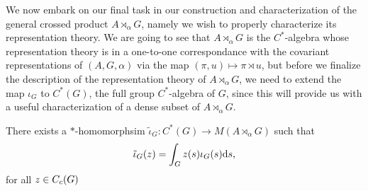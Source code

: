 We now embark on our final task in our construction and characterization of the general crossed product $A \rtimes_ \alpha G$, namely we wish to properly characterize its representation theory. We are going to see that $A \rtimes_\alpha G$ is the $C^*$-algebra whose representation theory is in a one-to-one correspondance with the covariant representations of $(A,G,\alpha)$ via the map $(\pi,u) \mapsto \pi \rtimes u$, but before we finalize the description of the representation theory of $A \rtimes_\alpha G$, we need to extend the map $\iota_G$ to $C^*(G)$, the full group $C^*$-algebra of $G$, since this will provide us with a useful characterization of a dense subset of $A \rtimes_\alpha G$.
\begin{lemma}
There exists a $*$-homomorphsim $\tilde \iota_G \colon C^*(G) \to M(A \rtimes_\alpha G)$ such that
\begin{align*}
	\tilde \iota_G(z) = \int_G z(s) \iota_G(s) \mathrm{d} s, 
\end{align*}
for all $z \in C_c(G)$
\label{cross:2.35}
\end{lemma}
